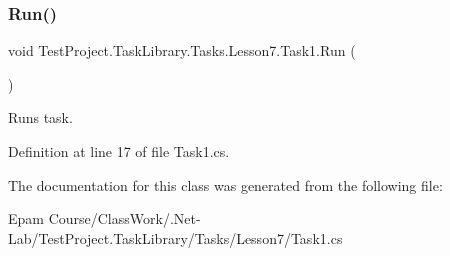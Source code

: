 \subsubsection{\texorpdfstring{Run()}{Run()}}
{\footnotesize\ttfamily void Test\+Project.\+Task\+Library.\+Tasks.\+Lesson7.\+Task1.\+Run (\begin{DoxyParamCaption}{ }\end{DoxyParamCaption})}



Runs task. 



Definition at line 17 of file Task1.\+cs.



The documentation for this class was generated from the following file\+:\begin{DoxyCompactItemize}
\item 
Epam Course/\+Class\+Work/.\+Net-\/\+Lab/\+Test\+Project.\+Task\+Library/\+Tasks/\+Lesson7/Task1.\+cs\end{DoxyCompactItemize}
